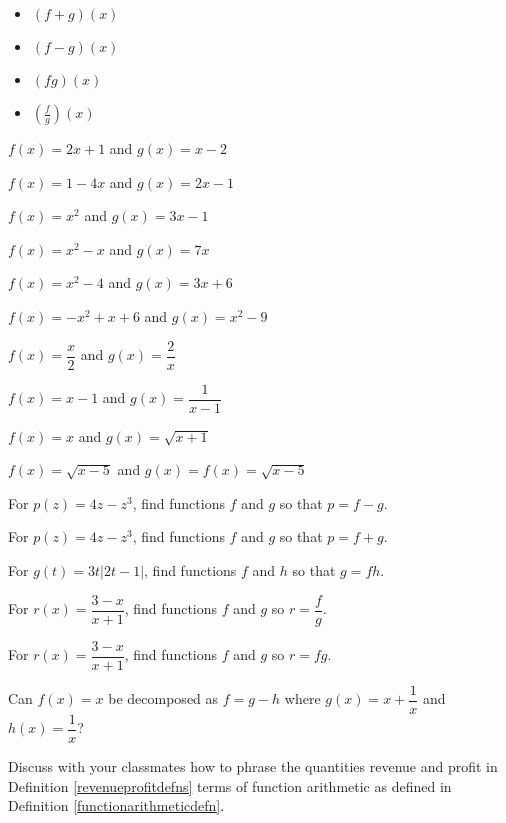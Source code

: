 \begin{exenum}
{\begin{itemize}

\item  $(f+g)(x)$
\item  $(f-g)(x)$
\item  $(fg)(x)$
\item  $\left(\frac{f}{g}\right)(x)$

\end{itemize}
}

\item $f(x) = 2x+1$ and $g(x) = x-2$ \label{basicarithtwofirst}
\item $f(x) = 1-4x$ and $g(x) = 2x-1$
\item $f(x) = x^2$ and $g(x) = 3x-1$
\item $f(x) = x^2-x$ and $g(x) = 7x$
\item $f(x) = x^2-4$ and $g(x) = 3x+6$
\item $f(x) = -x^2+x+6$ and $g(x) = x^2-9$
\item $f(x) = \dfrac{x}{2}$ and $g(x) = \dfrac{2}{x}$
\item $f(x) =x-1$ and $g(x) = \dfrac{1}{x-1}$
\item $f(x) = x$ and $g(x) = \sqrt{x+1}$
\item $f(x) =\sqrt{x-5}$ and $g(x) = f(x) = \sqrt{x-5}$ \label{basicarithtwolast}


\item  For $p(z) = 4z-z^3$, find functions $f$ and $g$ so that $p=f-g$. \label{decomposebasicfirst}
\item  For $p(z) = 4z-z^3$, find functions $f$ and $g$ so that $p=f+g$.
\item  For $g(t) = 3t|2t-1|$, find functions $f$ and $h$  so that $g = fh$.
\item  For $r(x) = \dfrac{3-x}{x+1}$, find functions $f$ and $g$ so $r = \dfrac{f}{g}$.
\item  For $r(x) = \dfrac{3-x}{x+1}$, find functions $f$ and $g$ so $r = fg$. \label{decomposebasiclast}

\item    Can $f(x) = x$ be decomposed as $f = g-h$ where $g(x) = x+\dfrac{1}{x}$ and $h(x) = \dfrac{1}{x}$?

\item   Discuss with your classmates how to phrase the quantities revenue and profit in Definition \ref{revenueprofitdefns} terms of function arithmetic as defined in Definition \ref{functionarithmeticdefn}.
 

\end{exenum}
